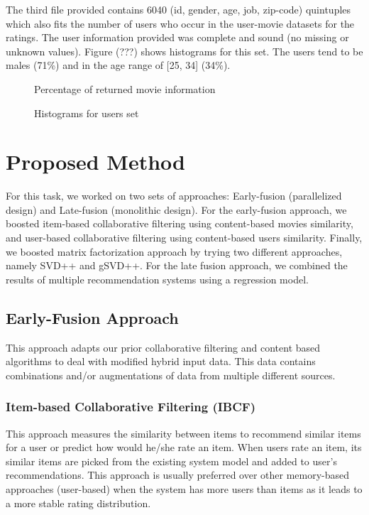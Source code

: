 \documentclass{sigish}
\begin{document}
The third file provided contains 6040 (id, gender, age, job, zip-code) quintuples which also fits the number of users who occur in the user-movie datasets for the ratings. The user information provided was complete and sound (no missing or unknown values). Figure (???) shows histograms for this set. The users tend to be males (71\%) and in the age range of [25, 34] (34\%).

\begin{figure}
\centering
\caption{Percentage of returned movie information}
\label{fig:sources}
\end{figure}

\begin{figure}
\centering
\caption{Histograms for users set}
\label{fig:density}
\end{figure}

\section{Proposed Method}

For this task, we worked on two sets of approaches: Early-fusion (parallelized design) and Late-fusion (monolithic design). For the early-fusion approach, we boosted item-based collaborative filtering using content-based movies similarity, and user-based collaborative filtering using content-based users similarity.  Finally, we boosted matrix factorization approach by trying two different approaches, namely SVD++ and gSVD++.
For the late fusion approach, we combined the results of multiple recommendation systems using a regression model.

\subsection{Early-Fusion Approach}

This approach adapts our prior collaborative filtering and content based algorithms to deal with modified hybrid input data. This data contains combinations and/or augmentations of data from multiple different sources.

\subsubsection{Item-based Collaborative Filtering (IBCF)}

This approach measures the similarity between items to recommend similar items for a user or predict how would he/she rate an item. When users rate an item, its similar items are picked from the existing system model and added to user's recommendations. This approach is usually preferred over other memory-based approaches (user-based) when the system has more users than items as it leads to a more stable rating distribution.
\end{document}
